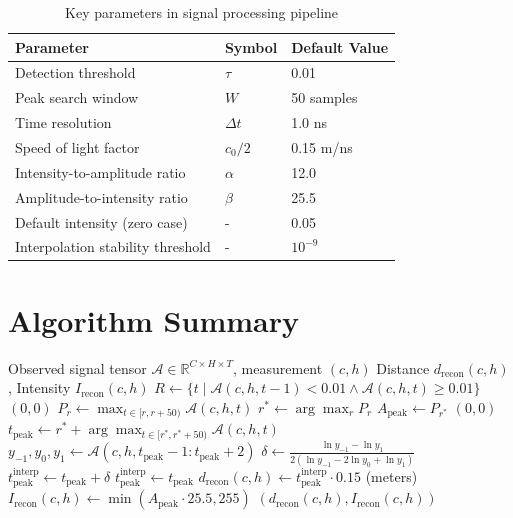 \documentclass[11pt]{article}
\begin{document}
\begin{table}[h]
\centering
\begin{tabular}{|l|l|l|}
\hline
\textbf{Parameter} & \textbf{Symbol} & \textbf{Default Value} \\
\hline
Detection threshold & $\tau$ & 0.01 \\
Peak search window & $W$ & 50 samples \\
Time resolution & $\Delta t$ & 1.0 ns \\
Speed of light factor & $c_0/2$ & 0.15 m/ns \\
Intensity-to-amplitude ratio & $\alpha$ & 12.0 \\
Amplitude-to-intensity ratio & $\beta$ & 25.5 \\
Default intensity (zero case) & - & 0.05 \\
Interpolation stability threshold & - & $10^{-9}$ \\
\hline
\end{tabular}
\caption{Key parameters in signal processing pipeline}
\end{table}

\section{Algorithm Summary}

\begin{algorithm}
\caption{Peak Detection and Distance Reconstruction from Tensor $\bm{\mathcal{A}}$}
\begin{algorithmic}[1]
\REQUIRE Observed signal tensor $\bm{\mathcal{A}} \in \mathbb{R}^{C \times H \times T}$, measurement $(c, h)$
\ENSURE Distance $d_{\text{recon}}(c, h)$, Intensity $I_{\text{recon}}(c, h)$
\STATE $R \gets \{t \mid \mathcal{A}(c,h,t-1) < 0.01 \land \mathcal{A}(c,h,t) \geq 0.01\}$
    \RETURN $(0, 0)$
\ENDIF
{}
    \STATE $P_r \gets \max_{t \in [r, r+50)} \mathcal{A}(c, h, t)$
\ENDFOR
\STATE $r^* \gets \arg\max_r P_r$
\STATE $A_{\text{peak}} \gets P_{r^*}$
    \RETURN $(0, 0)$
\ENDIF
\STATE $t_{\text{peak}} \gets r^* + \arg\max_{t \in [r^*, r^*+50)} \mathcal{A}(c, h, t)$
\STATE $y_{-1}, y_0, y_1 \gets \mathcal{A}(c, h, t_{\text{peak}}-1:t_{\text{peak}}+2)$
    \STATE $\delta \gets \frac{\ln y_{-1} - \ln y_1}{2(\ln y_{-1} - 2\ln y_0 + \ln y_1)}$
    \STATE $t_{\text{peak}}^{\text{interp}} \gets t_{\text{peak}} + \delta$
\ELSE
    \STATE $t_{\text{peak}}^{\text{interp}} \gets t_{\text{peak}}$
\ENDIF
\STATE $d_{\text{recon}}(c, h) \gets t_{\text{peak}}^{\text{interp}} \cdot 0.15$ (meters)
\STATE $I_{\text{recon}}(c, h) \gets \min(A_{\text{peak}} \cdot 25.5, 255)$
\RETURN $(d_{\text{recon}}(c, h), I_{\text{recon}}(c, h))$
\end{algorithmic}
\end{algorithm}
\end{document}
